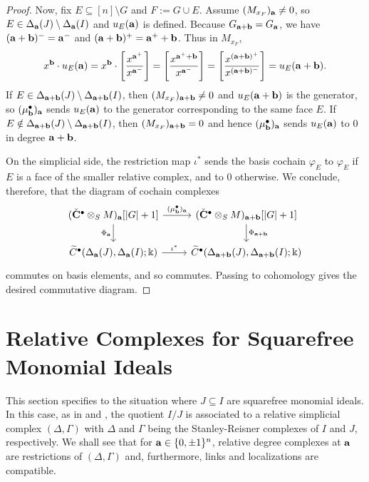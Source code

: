 \documentclass[12pt]{amsart}
\numberwithin{equation}{section}
\theoremstyle{definition}
\theoremstyle{definition}
\def\kk{{\Bbbk}}
\def\a{{\bold a}}
\def\b{{\bold b}}
\begin{document}
\begin{proof}
	Now, fix $E\subseteq[n]\setminus G$ and $F:=G\cup E$. Assume $(M_{x_F})_\a\neq 0$, so $E\in\Delta_\a(J)\setminus\Delta_\a(I)$
	and $u_E(\a)$ is defined. Because $G_{\a+\b}=G_\a$, we have $(\a+\b)^-=\a^-$ and $(\a+\b)^+=\a^++\b$.
	Thus in $M_{x_F}$,
	\[
	x^\b\cdot u_E(\a)
	=
	x^\b\cdot \left[\frac{x^{\a^+}}{x^{\a^-}}\right]
	=
	\left[\frac{x^{\a^++\b}}{x^{\a^-}}\right]
	=
	\left[\frac{x^{(\a+\b)^+}}{x^{(\a+\b)^-}}\right]
	=
	u_E(\a+\b).
	\]
	If $E\in\Delta_{\a+\b}(J)\setminus\Delta_{\a+\b}(I)$, then $(M_{x_F})_{\a+\b}\neq 0$ and $u_E(\a+\b)$ is the generator,
	so $(\mu_\b^\bullet)_\a$ sends $u_E(\a)$ to the generator corresponding to the same face $E$.
	If $E\notin\Delta_{\a+\b}(J)\setminus\Delta_{\a+\b}(I)$, then $(M_{x_F})_{\a+\b}=0$ and hence $(\mu_\b^\bullet)_\a$ sends
	$u_E(\a)$ to $0$ in degree $\a+\b$.
	
	On the simplicial side, the restriction map $\iota^\ast$ sends the basis cochain $\varphi_E$ to $\varphi_E$ if
	$E$ is a face of the smaller relative complex, and to $0$ otherwise. We conclude, therefore, that the diagram of cochain complexes
	\[
	\begin{tikzcd}
		(\Check{\bf C}^\bullet\otimes_S M)_\a[|G|+1]
		\arrow[r,"(\mu_\b^\bullet)_\a"]
		\arrow[d,"\Phi_\a"']
		&
		(\Check{\bf C}^\bullet\otimes_S M)_{\a+\b}[|G|+1]
		\arrow[d,"\Phi_{\a+\b}"]
		\\
		\widetilde C^\bullet(\Delta_\a(J),\Delta_\a(I);\kk)
		\arrow[r,"\iota^\ast"]
		&
		\widetilde C^\bullet(\Delta_{\a+\b}(J),\Delta_{\a+\b}(I);\kk)
	\end{tikzcd}
	\]
	commutes on basis elements, and so commutes.
	Passing to cohomology gives the desired commutative diagram.
\end{proof}


\section{Relative Complexes for Squarefree Monomial Ideals} \label{sec.monIdeals}

This section specifies to the situation where $J \subseteq I$ are squarefree monomial ideals. In this case, as in \cite{Stanley} and \cite{AS2016}, the quotient $I/J$ is associated to a relative simplicial complex $(\Delta,\Gamma)$ with $\Delta$ and $\Gamma$ being the Stanley-Reisner complexes of $I$ and $J$, respectively. We shall see that for $\a \in \{0,\pm 1\}^n$, relative degree complexes at $\a$ are restrictions of $(\Delta,\Gamma)$ and, furthermore, links and localizations are compatible.
\end{document}
